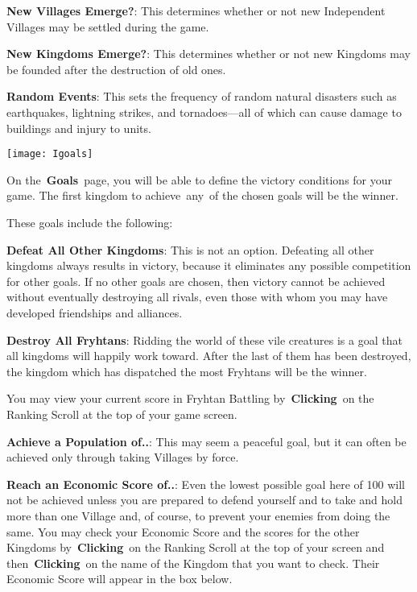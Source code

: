 \textbf{New Villages Emerge?}: This determines whether or not new Independent Villages may be settled during the game.

\textbf{New Kingdoms Emerge?}: This determines whether or not new Kingdoms may be founded after the destruction of old ones.

\textbf{Random Events}: This sets the frequency of random natural disasters such as earthquakes, lightning strikes, and tornadoes---all of which can cause damage to buildings and injury to units.

\begin{center}
	\texttt{[image: Igoals]}
\end{center}

On the \textbf{Goals} page, you will be able to define the victory conditions for your game. The first kingdom to achieve any of the chosen goals will be the winner.

These goals include the following:

\textbf{Defeat All Other Kingdoms}: This is not an option. Defeating all other kingdoms always results in victory, because it eliminates any possible competition for other goals. If no other goals are chosen, then victory cannot be achieved without eventually destroying all rivals, even those with whom you may have developed friendships and alliances.

\textbf{Destroy All Fryhtans}: Ridding the world of these vile creatures is a goal that all kingdoms will happily work toward. After the last of them has been destroyed, the kingdom which has dispatched the most Fryhtans will be the winner.

You may view your current score in Fryhtan Battling by \textbf{Clicking} on the Ranking Scroll at the top of your game screen.

\textbf{Achieve a Population of..}: This may seem a peaceful goal, but it can often be achieved only through taking Villages by force.

\textbf{Reach an Economic Score of..}: Even the lowest possible goal here of 100 will not be achieved unless you are prepared to defend yourself and to take and hold more than one Village and, of course, to prevent your enemies from doing the same. You may check your Economic Score and the scores for the other Kingdoms by \textbf{Clicking} on the Ranking Scroll at the top of your screen and then \textbf{Clicking} on the name of the Kingdom that you want to check. Their Economic Score will appear in the box below.


